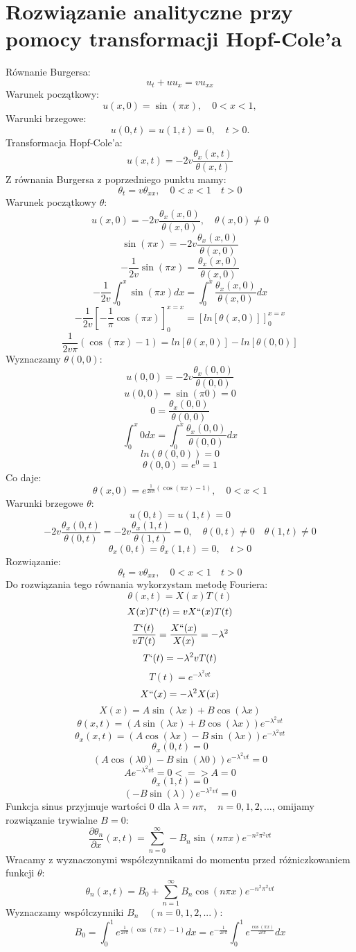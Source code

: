 \documentclass[a4paper,12pt]{article}
\begin{document}
\section{Rozwiązanie analityczne przy pomocy transformacji Hopf-Cole'a}
Równanie Burgersa: $$u_t +uu_x=vu_{xx}$$
Warunek początkowy: $$u(x,0)=\sin (\pi x), \quad 0<x<1,$$ Warunki brzegowe: $$u(0,t)=u(1,t)=0, \quad t>0. $$ Transformacja Hopf-Cole'a: $$u(x,t)=-2v\frac{\theta _x (x,t)}{\theta (x,t)}$$ Z równania Burgersa z poprzedniego punktu mamy: $$ \theta _t = v \theta _{xx}, \quad 0<x<1 \quad t>0$$
Warunek początkowy $\theta :$
$$u(x,0)=-2v\frac{\theta _x (x,0)}{\theta (x,0)}, \quad \theta (x,0) \neq 0$$
$$\sin (\pi x) = -2v\frac{\theta _x (x,0)}{\theta (x,0)}$$
$$-\frac{1}{2v}\sin (\pi x)=\frac{\theta _x (x,0)}{\theta (x,0)}$$
$$-\frac{1}{2v} \int^x_0 \sin (\pi x)dx = \int^x_0 \frac{\theta _x (x,0)}{\theta (x,0)}dx $$
$$-\frac{1}{2v} [-\frac{1}{\pi}\cos (\pi x)]^{x=x}_0=[ln[\theta (x,0)]]^{x=x}_0$$
$$\frac{1}{2v\pi}(\cos (\pi x)-1)=ln[\theta (x,0)]-ln[\theta (0,0)]$$
Wyznaczamy $\theta (0,0)$:
$$u(0,0)=-2v\frac{\theta _x (0,0)}{\theta (0,0)}$$
$$u(0,0)=\sin (\pi 0)=0$$
$$0=\frac{\theta _x (0,0)}{\theta (0,0)}$$
$$\int^x_0 0 dx = \int^x_0 \frac{\theta _x (0,0)}{\theta (0,0)} dx$$
$$ln(\theta(0,0))=0$$
$$\theta (0,0) = e^0=1$$
Co daje:
$$\theta (x,0)= e^{\frac{1}{2v\pi}(\cos (\pi x)-1)}, \quad 0<x<1$$
Warunki brzegowe $\theta:$
$$u(0,t)=u(1,t)=0$$
$$-2v\frac{\theta _x (0,t)}{\theta (0,t)}=-2v\frac{\theta _x (1,t)}{\theta (1,t)}=0,\quad \theta (0,t)\neq 0 \quad \theta (1,t) \neq 0$$
$$\theta _x (0,t) = \theta _x (1,t) =0, \quad t>0$$
Rozwiązanie: $$\theta _t = v \theta _{xx}, \quad 0<x<1 \quad t>0$$
Do rozwiązania tego równania wykorzystam metodę Fouriera:
$$\theta (x,t)=X(x)T(t)$$
$$X(x)T`(t)=vX``(x)T(t)$$
$$\frac{T`(t)}{vT(t)}=\frac{X``(x)}{X(x)}=-\lambda ^2$$
$$T`(t)=-\lambda ^2 vT(t)$$
$$T(t)=e^{-\lambda ^2 vt}$$
$$X``(x)=-\lambda ^2X(x)$$
$$X(x)=A\sin(\lambda x)+B\cos(\lambda x)$$
$$\theta (x,t) = (A\sin(\lambda x)+B\cos(\lambda x))e^{-\lambda ^2 vt}$$
$$\theta _x (x,t)=(A\cos(\lambda x)-B\sin(\lambda x))e^{-\lambda ^2 vt}$$
$$\theta _x (0,t)=0$$
$$(A\cos(\lambda 0)-B\sin(\lambda 0))e^{-\lambda ^2 vt}=0$$
$$Ae^{-\lambda ^2 vt}=0 <=> A =0$$
$$\theta _x (1,t)=0$$
$$(-B\sin(\lambda))e^{-\lambda ^2 vt}=0$$
Funkcja sinus przyjmuje wartości 0 dla $\lambda=n\pi,\quad n=0,1,2,...$, omijamy rozwiązanie trywialne $B=0$:
$$\frac{\partial \theta _n}{\partial x} (x,t) = \sum_{n=0}^{\infty}-B_n \sin (n\pi x) e^{-n^2 \pi ^2 vt} $$
Wracamy z wyznaczonymi współczynnikami do momentu przed różniczkowaniem funkcji $\theta$:
$$\theta _n (x,t) =B_0+ \sum_{n=1}^\infty B_n \cos (n\pi x) e^{-n^2 \pi ^2 vt}$$
Wyznaczamy współczynniki $B_n\quad (n=0,1,2,...)$:
$$B_0 = \int_0^1 e^{\frac{1}{2v\pi}(\cos (\pi x)-1)}dx 
=e^{-\frac{1}{2v\pi}}\int_0^1 e^{\frac{\cos (\pi x)}{2v\pi}}dx$$
\end{document}
